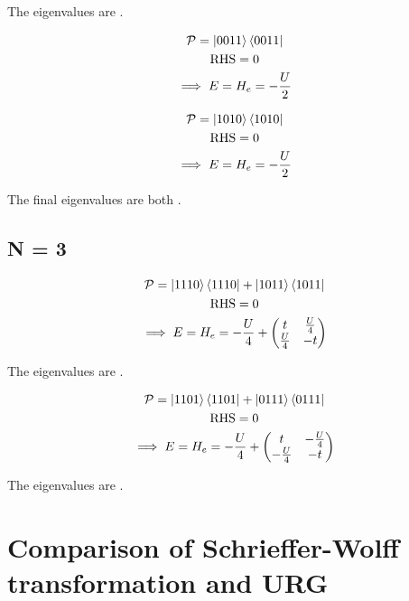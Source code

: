 \documentclass[12pt]{article}
\begin{document}
The eigenvalues are .

\begin{gather}
	\mathcal{P} = \ket{0011}\bra{0011}\\
	\text{RHS} = 0 \\
	\implies E = H_e = -\frac{U}{2}
\end{gather}

\begin{gather}
	\mathcal{P} = \ket{1010}\bra{1010}\\
	\text{RHS} = 0 \\
	\implies E = H_e = -\frac{U}{2}
\end{gather}

The final eigenvalues are both .

\subsection{N = 3}

\begin{gather}
	\mathcal{P} = \ket{1110}\bra{1110}+\ket{1011}\bra{1011}\\
	\text{RHS} = 0 \\
	\implies E = H_e = -\frac{U}{4}+\begin{pmatrix} t & \frac{U}{4} \\ \frac{U}{4} & -t \end{pmatrix} 
\end{gather}

The eigenvalues are .

\begin{gather}
	\mathcal{P} = \ket{1101}\bra{1101}+\ket{0111}\bra{0111}\\
	\text{RHS} = 0 \\
	\implies E = H_e = -\frac{U}{4}+\begin{pmatrix} t & -\frac{U}{4} \\ -\frac{U}{4} & -t \end{pmatrix} 
\end{gather}

The eigenvalues are .

\newpage

\section{Comparison of Schrieffer-Wolff transformation and URG}
\end{document}
